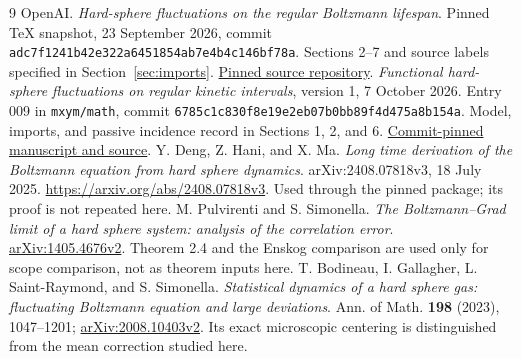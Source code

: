 \documentclass[11pt,letterpaper]{article}
\numberwithin{equation}{section}
\theoremstyle{definition}\newtheorem{assumption}[theorem]{Assumption}
\theoremstyle{remark}\newtheorem{remark}[theorem]{Remark}
\begin{document}
\clearpage
\begin{thebibliography}{9}\small
{} OpenAI. \emph{Hard-sphere fluctuations on the regular Boltzmann lifespan}. Pinned TeX snapshot, 23 September 2026, commit \texttt{adc7f1241b42e322a6451854ab7e4b4c146bf78a}. Sections 2--7 and source labels specified in Section~\ref{sec:imports}. \href{https://github.com/openai/math/tree/adc7f1241b42e322a6451854ab7e4b4c146bf78a/preprints/Hard-sphere-fluctuations-on-the-regular-Boltzmann-lifespan-September-23-2026/build}{Pinned source repository}.
 \emph{Functional hard-sphere fluctuations on regular kinetic intervals}, version 1, 7 October 2026. Entry 009 in \texttt{mxym/math}, commit \texttt{6785c1c830f8e19e2eb07b0bb89f4d475a8b154a}. Model, imports, and passive incidence record in Sections 1, 2, and 6. \href{https://github.com/mxym/math/tree/6785c1c830f8e19e2eb07b0bb89f4d475a8b154a/preprints/009-functional-hard-sphere-fluctuations/v1}{Commit-pinned manuscript and source}.
 Y. Deng, Z. Hani, and X. Ma. \emph{Long time derivation of the Boltzmann equation from hard sphere dynamics}. arXiv:2408.07818v3, 18 July 2025. \url{https://arxiv.org/abs/2408.07818v3}. Used through the pinned package; its proof is not repeated here.
 M. Pulvirenti and S. Simonella. \emph{The Boltzmann--Grad limit of a hard sphere system: analysis of the correlation error}. \href{https://arxiv.org/abs/1405.4676v2}{arXiv:1405.4676v2}. Theorem 2.4 and the Enskog comparison are used only for scope comparison, not as theorem inputs here.
 T. Bodineau, I. Gallagher, L. Saint-Raymond, and S. Simonella. \emph{Statistical dynamics of a hard sphere gas: fluctuating Boltzmann equation and large deviations}. Ann. of Math. \textbf{198} (2023), 1047--1201; \href{https://arxiv.org/abs/2008.10403v2}{arXiv:2008.10403v2}. Its exact microscopic centering is distinguished from the mean correction studied here.
\end{thebibliography}
\end{document}
